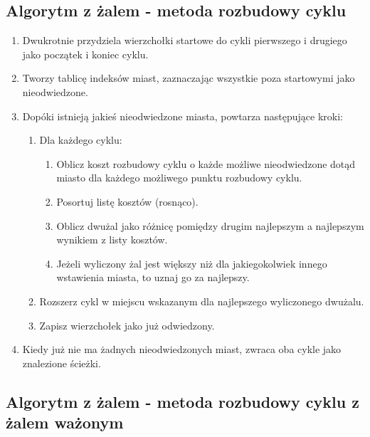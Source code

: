 \documentclass[11pt]{article}
\begin{document}
\subsection{Algorytm z żalem - metoda rozbudowy cyklu}\label{subsec:algorytm-z-zalem---metoda-rozbudowy-cyklu}

\begin{enumerate}
    \item Dwukrotnie przydziela wierzchołki startowe do cykli pierwszego i drugiego jako początek i koniec cyklu.
    \item Tworzy tablicę indeksów miast, zaznaczając wszystkie poza startowymi jako nieodwiedzone.
    \item Dopóki istnieją jakieś nieodwiedzone miasta, powtarza następujące kroki:
    \begin{enumerate}
        \item Dla każdego cyklu:
        \begin{enumerate}
            \item Oblicz koszt rozbudowy cyklu o każde możliwe nieodwiedzone dotąd miasto dla każdego możliwego punktu rozbudowy cyklu.
            \item Posortuj listę kosztów (rosnąco).
            \item Oblicz dwużal jako różnicę pomiędzy drugim najlepszym a najlepszym wynikiem z listy kosztów.
            \item Jeżeli wyliczony żal jest większy niż dla jakiegokolwiek innego wstawienia miasta, to uznaj go za najlepszy.
        \end{enumerate}
        \item Rozszerz cykl w miejscu wskazanym dla najlepszego wyliczonego dwużalu.
        \item Zapisz wierzchołek jako już odwiedzony.
    \end{enumerate}
    \item Kiedy już nie ma żadnych nieodwiedzonych miast, zwraca oba cykle jako znalezione ścieżki.
\end{enumerate}


\subsection{Algorytm z żalem - metoda rozbudowy cyklu z żalem ważonym}\label{subsec:algorytm-z-zalem---metoda-rozbudowy-cyklu-z-zalem-wazonym}
\end{document}

